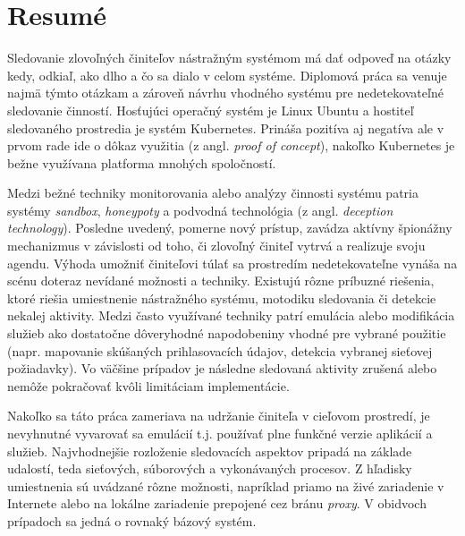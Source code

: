 \chapter*{Resumé}
Sledovanie zlovoľných činiteľov nástražným systémom má dať odpoveď na otázky kedy, odkiaľ, ako dlho a čo sa dialo v celom systéme. Diplomová práca sa venuje najmä týmto otázkam a zároveň návrhu vhodného systému pre nedetekovateľné sledovanie činností. Hosťujúci operačný systém je Linux Ubuntu a hostiteľ sledovaného prostredia je systém Kubernetes. Prináša pozitíva aj negatíva ale v prvom rade ide o dôkaz využitia (z angl. \textit{proof of concept}), nakoľko Kubernetes je bežne využívana platforma mnohých spoločností.

Medzi bežné techniky monitorovania alebo analýzy činnosti systému patria systémy \textit{sandbox}, \textit{honeypoty} a podvodná technológia (z angl. \textit{deception technology}). Posledne uvedený, pomerne nový prístup, zavádza aktívny špionážny mechanizmus v závislosti od toho, či zlovoľný činiteľ vytrvá a realizuje svoju agendu. Výhoda umožniť činiteľovi túlať sa prostredím nedetekovateľne vynáša na scénu doteraz nevídané možnosti a techniky. Existujú rôzne príbuzné riešenia, ktoré riešia umiestnenie nástražného systému, motodiku sledovania či detekcie nekalej aktivity. Medzi často využívané techniky patrí emulácia alebo modifikácia služieb ako dostatočne dôveryhodné napodobeniny vhodné pre vybrané použitie (napr. mapovanie skúšaných prihlasovacích údajov, detekcia vybranej sieťovej požiadavky). Vo väčšine prípadov je následne sledovaná aktivity zrušená alebo nemôže pokračovať kvôli limitáciam implementácie.

Nakoľko sa táto práca zameriava na udržanie činiteľa v cieľovom prostredí, je nevyhnutné vyvarovať sa emulácií t.j. používať plne funkčné verzie aplikácií a služieb. Najvhodnejšie rozloženie sledovacích aspektov pripadá na základe udalostí, teda sieťových, súborových a vykonávaných procesov. Z hľadisky umiestnenia sú uvádzané rôzne možnosti, napríklad priamo na živé zariadenie v Internete alebo na lokálne zariadenie prepojené cez bránu \textit{proxy}. V obidvoch prípadoch sa jedná o rovnaký bázový systém.

